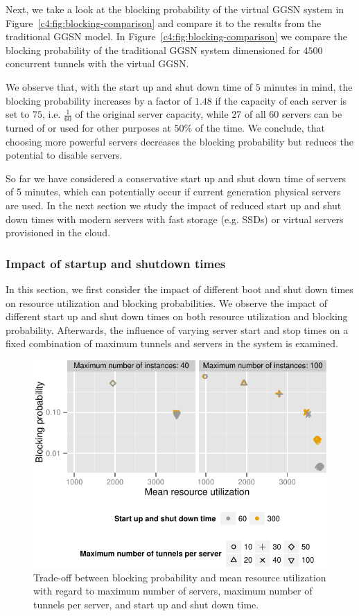 Next, we take a look at the blocking probability of the virtual \gls{GGSN} system in Figure~\ref{c4:fig:blocking-comparison} and compare it to the results from the traditional \gls{GGSN} model. In Figure~\ref{c4:fig:blocking-comparison} we compare the blocking probability of the traditional \gls{GGSN} system dimensioned for $4500$ concurrent tunnels with the virtual \gls{GGSN}.

We observe that, with the start up and shut down time of $5$ minutes in mind, the blocking probability increases by a factor of $1.48$ if the capacity of each server is set to $75$, i.e. $\frac{1}{60}$ of the original server capacity, while $27$ of all $60$ servers can be turned of or used for other purposes at $50\%$ of the time. We conclude, that choosing more powerful servers decreases the blocking probability but reduces the potential to disable servers.

So far we have considered a conservative start up and shut down time of servers of 5 minutes, which can potentially occur if current generation physical servers are used.
In the next section we study the impact of reduced start up and shut down times with modern servers with fast storage (e.g. \glspl{SSD}) or virtual servers provisioned in the cloud.


\subsubsection{Impact of startup and shutdown times}
\label{c4:sec:real_virtual_ggsn}

In this section, we first consider the impact of different boot and shut down times on resource utilization and blocking probabilities. We observe the impact of different start up and shut down times on both resource utilization and blocking probability. Afterwards, the influence of varying server start and stop times on a fixed combination of maximum tunnels and servers in the system is examined.

\begin{figure}[htb]
  \centering
  \includegraphics{images/compare-util-block.pdf}
  \caption{Trade-off between blocking probability and mean resource utilization with regard to maximum number of servers, maximum number of tunnels per server, and start up and shut down time.}
 \label{c4:fig:compare_util_block}
\end{figure}

